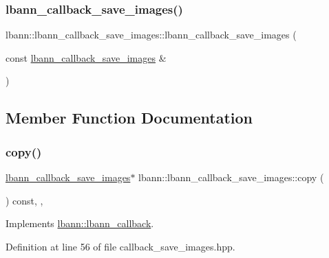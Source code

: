 \subsubsection{\texorpdfstring{lbann\+\_\+callback\+\_\+save\+\_\+images()}{lbann\_callback\_save\_images()}\hspace{0.1cm}{\footnotesize\ttfamily [2/2]}}
{\footnotesize\ttfamily lbann\+::lbann\+\_\+callback\+\_\+save\+\_\+images\+::lbann\+\_\+callback\+\_\+save\+\_\+images (\begin{DoxyParamCaption}\item[{const \hyperlink{classlbann_1_1lbann__callback__save__images}{lbann\+\_\+callback\+\_\+save\+\_\+images} \&}]{ }\end{DoxyParamCaption})\hspace{0.3cm}{\ttfamily [default]}}



\subsection{Member Function Documentation}
\mbox{\label{classlbann_1_1lbann__callback__save__images_a6abba6b6a94080c09f52f1aac8773461}} 
\subsubsection{\texorpdfstring{copy()}{copy()}}
{\footnotesize\ttfamily \hyperlink{classlbann_1_1lbann__callback__save__images}{lbann\+\_\+callback\+\_\+save\+\_\+images}$\ast$ lbann\+::lbann\+\_\+callback\+\_\+save\+\_\+images\+::copy (\begin{DoxyParamCaption}{ }\end{DoxyParamCaption}) const\hspace{0.3cm}{\ttfamily [inline]}, {\ttfamily [override]}, {\ttfamily [virtual]}}



Implements \hyperlink{classlbann_1_1lbann__callback_a9f545d1269a8c7af335625d049691f26}{lbann\+::lbann\+\_\+callback}.



Definition at line 56 of file callback\+\_\+save\+\_\+images.\+hpp.


